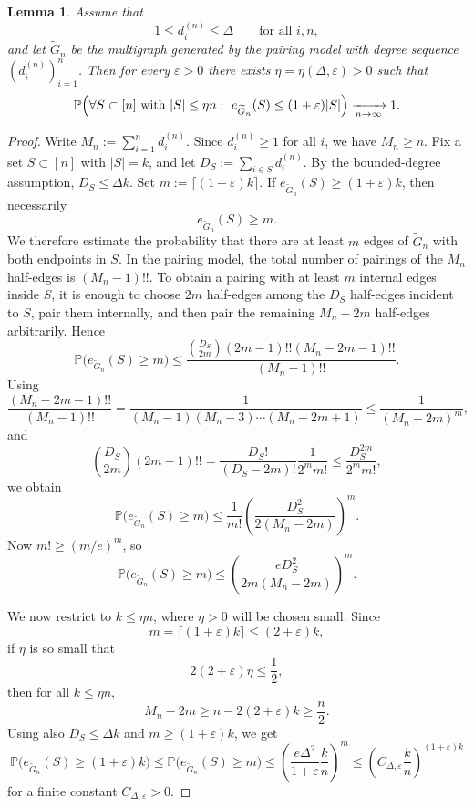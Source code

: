 \documentclass[11pt]{article}
\newtheorem{lemma}[theorem]{Lemma}
\theoremstyle{remark}
\theoremstyle{plain}
\newcommand{\Pbb}{\mathbb{P}}
\newcommand{\1}{\mathbbm{1}}
\begin{document}
\begin{lemma}
\label{lem:A1-CM-pairing}
Assume that
\[
1\le d_i^{(n)}\le \Delta
\qquad\text{for all }i,n,
\]
and let \(\widetilde G_n\) be the multigraph generated by the pairing model with degree sequence \((d_i^{(n)})_{i=1}^n\). Then for every \(\varepsilon>0\) there exists \(\eta=\eta(\Delta,\varepsilon)>0\) such that
\[
\Pbb\Bigl(
\forall S\subset[n]\text{ with }|S|\le \eta n:\ 
e_{\widetilde G_n}(S)\le (1+\varepsilon)|S|
\Bigr)\xrightarrow[n\to\infty]{}1.
\]
\end{lemma}

\begin{proof}
Write $M_n:=\sum_{i=1}^n d_i^{(n)}$.
Since \(d_i^{(n)}\ge 1\) for all \(i\), we have \(M_n\ge n\). Fix a set \(S\subset[n]\) with \(|S|=k\), and let $D_S:=\sum_{i\in S} d_i^{(n)}$.
By the bounded-degree assumption, $D_S\le \Delta k$. Set $m:=\lceil (1+\varepsilon)k\rceil$.
If \(e_{\widetilde G_n}(S)\ge (1+\varepsilon)k\), then necessarily
\[
e_{\widetilde G_n}(S)\ge m.
\]
We therefore estimate the probability that there are at least \(m\) edges of \(\widetilde G_n\) with both endpoints in \(S\).
In the pairing model, the total number of pairings of the \(M_n\) half-edges is $(M_n-1)!!$.
To obtain a pairing with at least \(m\) internal edges inside \(S\), it is enough to choose \(2m\) half-edges among the \(D_S\) half-edges incident to \(S\), pair them internally, and then pair the remaining \(M_n-2m\) half-edges arbitrarily. Hence
\[
\Pbb\bigl(e_{\widetilde G_n}(S)\ge m\bigr)
\le
\frac{\binom{D_S}{2m}(2m-1)!!(M_n-2m-1)!!}{(M_n-1)!!}.
\]
Using
\[
\frac{(M_n-2m-1)!!}{(M_n-1)!!}
=
\frac{1}{(M_n-1)(M_n-3)\cdots(M_n-2m+1)}
\le
\frac{1}{(M_n-2m)^m},
\]
and
\[
\binom{D_S}{2m}(2m-1)!!
=
\frac{D_S!}{(D_S-2m)!}\frac{1}{2^m m!}
\le
\frac{D_S^{2m}}{2^m m!},
\]
we obtain
\[
\Pbb\bigl(e_{\widetilde G_n}(S)\ge m\bigr)
\le
\frac{1}{m!}
\left(\frac{D_S^2}{2(M_n-2m)}\right)^m.
\]
Now \(m!\ge (m/e)^m\), so
\[
\Pbb\bigl(e_{\widetilde G_n}(S)\ge m\bigr)
\le
\left(
\frac{eD_S^2}{2m(M_n-2m)}
\right)^m.
\]

We now restrict to \(k\le \eta n\), where \(\eta>0\) will be chosen small. Since
\[
m=\lceil(1+\varepsilon)k\rceil\le (2+\varepsilon)k,
\]
if \(\eta\) is so small that
\[
2(2+\varepsilon)\eta\le \frac12,
\]
then for all \(k\le \eta n\),
\[
M_n-2m\ge n-2(2+\varepsilon)k\ge \frac n2.
\]
Using also \(D_S\le \Delta k\) and \(m\ge (1+\varepsilon)k\), we get
\[
\Pbb\bigl(e_{\widetilde G_n}(S)\ge (1+\varepsilon)k\bigr)
\le
\Pbb\bigl(e_{\widetilde G_n}(S)\ge m\bigr)
\le
\left(
\frac{e\Delta^2}{1+\varepsilon}\frac{k}{n}
\right)^m
\le
\left(
C_{\Delta,\varepsilon}\frac{k}{n}
\right)^{(1+\varepsilon)k}
\]
for a finite constant \(C_{\Delta,\varepsilon}>0\).


\end{proof}
\end{document}
